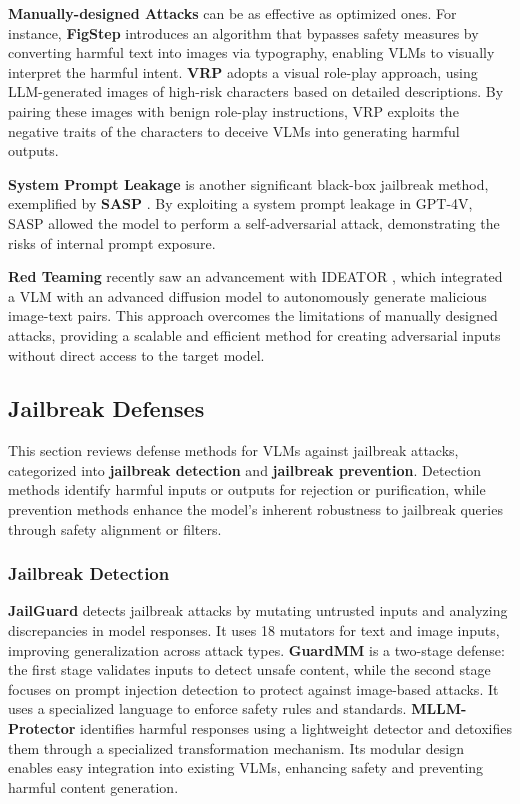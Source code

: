 \textbf{Manually-designed Attacks} can be as effective as optimized ones. For instance, \textbf{FigStep} \cite{gong2023figstep} introduces an algorithm that bypasses safety measures by converting harmful text into images via typography, enabling VLMs to visually interpret the harmful intent. \textbf{VRP} \cite{ma2024visual} adopts a visual role-play approach, using LLM-generated images of high-risk characters based on detailed descriptions. By pairing these images with benign role-play instructions, VRP exploits the negative traits of the characters to deceive VLMs into generating harmful outputs.

\textbf{System Prompt Leakage} is another significant black-box jailbreak method, exemplified by \textbf{SASP} \cite{wu2023jailbreaking}. By exploiting a system prompt leakage in GPT-4V, SASP allowed the model to perform a self-adversarial attack, demonstrating the risks of internal prompt exposure.

\textbf{Red Teaming} recently saw an advancement with IDEATOR \cite{wang2024ideator}, which integrated a VLM with an advanced diffusion model to autonomously generate malicious image-text pairs. This approach overcomes the limitations of manually designed attacks, providing a scalable and efficient method for creating adversarial inputs without direct access to the target model.

\subsection{Jailbreak Defenses}
\label{sec:vlm-defenses}



This section reviews defense methods for VLMs against jailbreak attacks, categorized into \textbf{jailbreak detection} and \textbf{jailbreak prevention}. Detection methods identify harmful inputs or outputs for rejection or purification, while prevention methods enhance the model's inherent robustness to jailbreak queries through safety alignment or filters.

\subsubsection{Jailbreak Detection}
\textbf{JailGuard} \cite{zhang2023mutation} detects jailbreak attacks by mutating untrusted inputs and analyzing discrepancies in model responses. It uses 18 mutators for text and image inputs, improving generalization across attack types. 
\textbf{GuardMM} \cite{sharma2024defending} is a two-stage defense: the first stage validates inputs to detect unsafe content, while the second stage focuses on prompt injection detection to protect against image-based attacks. It uses a specialized language to enforce safety rules and standards. \textbf{MLLM-Protector} \cite{pi2024mllm} identifies harmful responses using a lightweight detector and detoxifies them through a specialized transformation mechanism. Its modular design enables easy integration into existing VLMs, enhancing safety and preventing harmful content generation.

